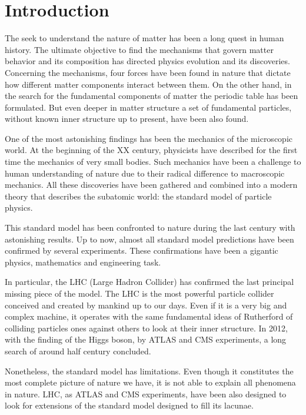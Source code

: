 \chapter*{Introduction}

The seek to understand the nature of matter has been a long quest in human history. The ultimate objective to find the mechanisms that govern matter behavior and its composition has directed physics evolution and its discoveries. Concerning the mechanisms, four forces have been found in nature that dictate how different matter components interact between them. On the other hand, in the search for the fundamental components of matter the periodic table has been formulated. But even deeper in matter structure a set of fundamental particles, without known inner structure up to present, have been also found. 

One of the most astonishing findings has been the mechanics of the microscopic world. At the beginning of the XX century, physicists have described for the first time the mechanics of very small bodies. Such mechanics have been a challenge to human understanding of nature due to their radical difference to macroscopic mechanics. All these discoveries have been gathered and combined into a modern theory that describes the subatomic world: the standard model of particle physics. 

This standard model has been confronted to nature during the last century with astonishing results. Up to now, almost all standard model predictions have been confirmed by several experiments. These confirmations have been a gigantic physics, mathematics and engineering task.

In particular, the LHC (Large Hadron Collider) has confirmed the last principal missing piece of the model. The LHC is the most powerful particle collider conceived and created by mankind up to our days. Even if it is a very big and complex machine, it operates with the same fundamental ideas of Rutherford of colliding particles ones against others to look at their inner structure. In 2012, with the finding of the Higgs boson, by ATLAS and CMS experiments, a long search of around half century concluded.

Nonetheless, the standard model has limitations. Even though it constitutes the most complete picture of nature we have, it is not able to explain all phenomena in nature. LHC, as ATLAS and CMS experiments, have been also designed to look for extensions of the standard model designed to fill its lacunae. 

